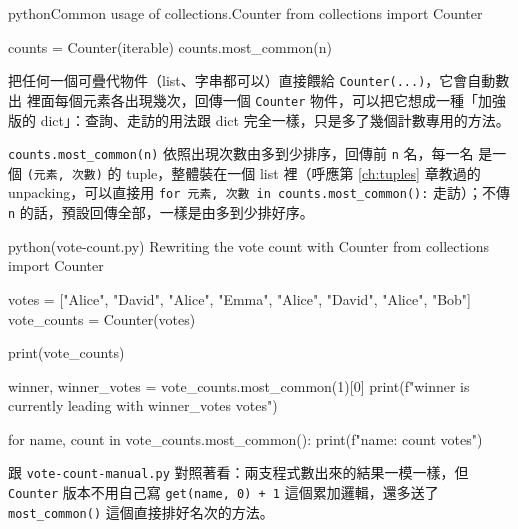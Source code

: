 \begin{code}{python}{Common usage of collections.Counter}
from collections import Counter

counts = Counter(iterable)
counts.most_common(n)
\end{code}

把任何一個可疊代物件（list、字串都可以）直接餵給 \texttt{Counter(...)}，它會自動數出
裡面每個元素各出現幾次，回傳一個 \texttt{Counter} 物件，可以把它想成一種「加強版的
dict」：查詢、走訪的用法跟 dict 完全一樣，只是多了幾個計數專用的方法。

\texttt{counts.most\_common(n)} 依照出現次數由多到少排序，回傳前 \texttt{n} 名，每一名
是一個 \texttt{(元素, 次數)} 的 tuple，整體裝在一個 list 裡（呼應第 \ref{ch:tuples} 章教過的
unpacking，可以直接用 \texttt{for 元素, 次數 in counts.most\_common():} 走訪）；不傳
\texttt{n} 的話，預設回傳全部，一樣是由多到少排好序。

\begin{example}{python}{(vote-count.py) Rewriting the vote count with Counter}
from collections import Counter

votes = ["Alice", "David", "Alice", "Emma", "Alice", "David", "Alice", "Bob"]
vote_counts = Counter(votes)

print(vote_counts)

winner, winner_votes = vote_counts.most_common(1)[0]
print(f"{winner} is currently leading with {winner_votes} votes")

for name, count in vote_counts.most_common():
    print(f"{name}: {count} votes")
\end{example}


跟 \texttt{vote-count-manual.py} 對照著看：兩支程式數出來的結果一模一樣，但
\texttt{Counter} 版本不用自己寫 \texttt{get(name, 0) + 1} 這個累加邏輯，還多送了
\texttt{most\_common()} 這個直接排好名次的方法。


